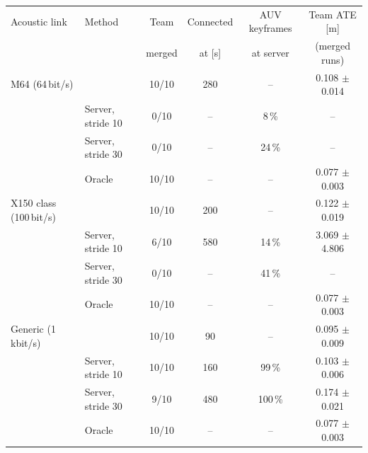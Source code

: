 \begin{tabular}{llcccc}
\toprule
Acoustic link & Method & Team & Connected & AUV keyframes & Team ATE [m] \\
 & & merged & at [s] & at server & (merged runs) \\
\midrule
M64 (64\,bit/s) & \avatar{} & 10/10 & 280 & -- & 0.108 $\pm$ 0.014 \\
 & Server, stride 10 & 0/10 & -- & 8\,\% & -- \\
 & Server, stride 30 & 0/10 & -- & 24\,\% & -- \\
 & Oracle & 10/10 & -- & -- & 0.077 $\pm$ 0.003 \\
\midrule
X150 class (100\,bit/s) & \avatar{} & 10/10 & 200 & -- & 0.122 $\pm$ 0.019 \\
 & Server, stride 10 & 6/10 & 580 & 14\,\% & 3.069 $\pm$ 4.806 \\
 & Server, stride 30 & 0/10 & -- & 41\,\% & -- \\
 & Oracle & 10/10 & -- & -- & 0.077 $\pm$ 0.003 \\
\midrule
Generic (1\,kbit/s) & \avatar{} & 10/10 & 90 & -- & 0.095 $\pm$ 0.009 \\
 & Server, stride 10 & 10/10 & 160 & 99\,\% & 0.103 $\pm$ 0.006 \\
 & Server, stride 30 & 9/10 & 480 & 100\,\% & 0.174 $\pm$ 0.021 \\
 & Oracle & 10/10 & -- & -- & 0.077 $\pm$ 0.003 \\
\bottomrule
\end{tabular}

